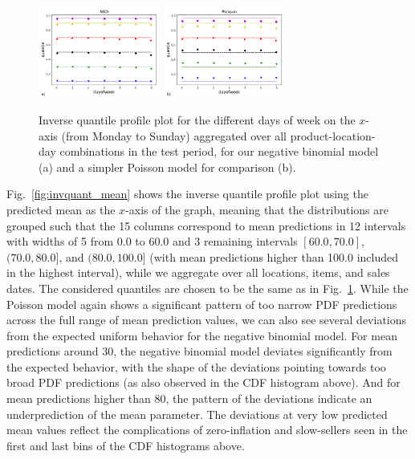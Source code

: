 \documentclass[BCOR=1mm, DIV=calc,10pt,
twoside=true,
twocolumn,
headings=normal]{scrartcl}
\newcommand{\fig}{Fig.~}
\begin{document}
\begin{figure}
\begin{center}
\includegraphics[width=4cm]{figs/invquant_dayofweek_nbinom}
\includegraphics[width=4cm]{figs/invquant_dayofweek_poisson}
\caption{\label{fig:invquant_dayofweek} Inverse quantile profile plot for the different days of week on the $x$-axis (from Monday to Sunday) aggregated over all product-location-day combinations in the test period, for our negative binomial model (a) and a simpler Poisson model for comparison (b).}
\end{center}
\end{figure}

\fig \ref{fig:invquant_mean} shows the inverse quantile profile plot using the predicted mean as the $x$-axis of the graph, meaning that the distributions are grouped such that the 15 columns correspond to mean predictions in 12 intervals with widths of 5 from 0.0 to 60.0 and 3 remaining intervals $[60.0, 70.0]$, $(70.0, 80.0]$, and $(80.0, 100.0]$ (with mean predictions higher than 100.0 included in the highest interval), while we aggregate over all locations, items, and sales dates. The considered quantiles are chosen to be the same as in \fig \ref{fig:invquant_dayofweek}. While the Poisson model again shows a significant pattern of too narrow PDF predictions across the full range of mean prediction values, we can also see several deviations from the expected uniform behavior for the negative binomial model. For mean predictions around $30$, the negative binomial model deviates significantly from the expected behavior, with the shape of the deviations pointing towards too broad PDF predictions (as also observed in the CDF histogram above). And for mean predictions higher than $80$, the pattern of the deviations indicate an underprediction of the mean parameter. The deviations at very low predicted mean values reflect the complications of zero-inflation and slow-sellers seen in the first and last bins of the CDF histograms above.
\end{document}
